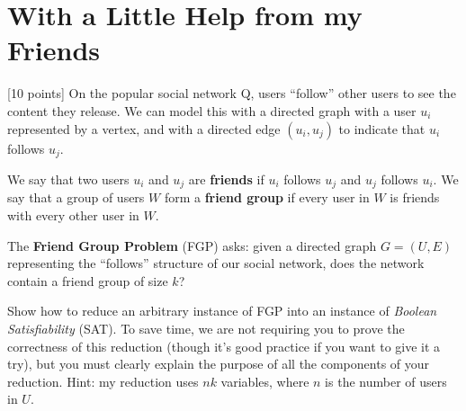 \section{With a Little Help from my Friends}

[10 points] On the popular social network Q, users ``follow'' other users to see the content they release. We can model this with a directed graph with a user $u_i$ represented by a vertex, and with a directed edge $(u_i, u_j)$ to indicate that $u_i$ follows $u_j$.

We say that two users $u_i$ and $u_j$ are \textbf{friends} if $u_i$ follows $u_j$ and $u_j$ follows $u_i$. We say that a group of users $W$ form a \textbf{friend group} if every user in $W$ is friends with every other user in $W$.

The \textbf{Friend Group Problem} (FGP) asks: given a directed graph $G = (U,E)$ representing the ``follows'' structure of our social network, does the network contain a friend group of size $k$?

Show how  to reduce an arbitrary  instance of FGP
into  an instance  of  \emph {Boolean  Satisfiability}  (SAT). To save time, we are not requiring you to prove the correctness of this reduction (though it's good practice if you want to give it a try), but you must clearly explain the purpose of all the components of your reduction. Hint:  my reduction uses $nk$ variables, where $n$ is the number of users in $U$.

\ifsolutions\fi
